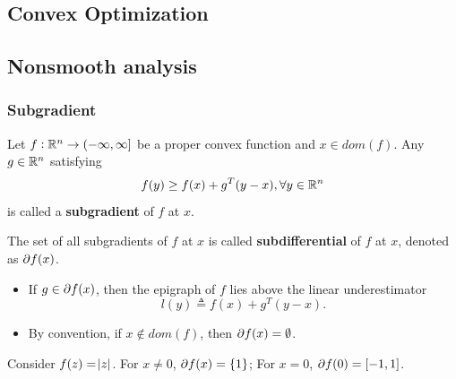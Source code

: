 \begin{refsection}
\startcontents[chapters]
\chapter{Convex Optimization}\label{ch:convex-optimization}
\section{Nonsmooth analysis}
\subsection{Subgradient}
\begin{definition} Let $f:\mathbb{R}^n\to (-\infty,\infty]$ be a proper convex function and $x\in dom(f)$. Any $g\in \mathbb{R}^n$ satisfying 
	$$f(y) \geq f(x) + g^T(y-x), \forall y\in \mathbb{R}^n$$
	is called a \textbf{subgradient} of $f$ at $x$. 
	
	The set of all subgradients of $f$ at $x$ is called \textbf{subdifferential} of $f$ at $x$, denoted as $\partial f(x)$.
\end{definition}

\begin{remark}\hfill
	\begin{itemize}
		\item If $g\in \partial f(x)$, then the epigraph of $f$ lies above the linear underestimator
		$$l(y) \triangleq f(x) + g^T(y-x).$$
		\item By convention, if $x\notin dom(f)$, then $\partial f(x) = \emptyset$.
	\end{itemize}
\end{remark}

\begin{example}
Consider $f(z) = \abs{z}$. For $x\neq 0$, $\partial f(x) = \{1\}$; For $x = 0$, $\partial f(0) = [-1, 1]$.
\end{example}


\end{refsection}
